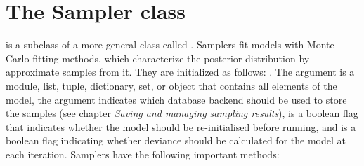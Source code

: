 \documentclass[letterpaper,10pt,english]{sphinxmanual}
\begin{document}
\section{The Sampler class}
\label{modelfitting:the-sampler-class}\label{modelfitting:sec-sampler}
 is a subclass of a more general class called . Samplers fit models with Monte Carlo fitting methods, which characterize the posterior distribution by approximate samples from it. They are initialized as follows: . The  argument is a module, list, tuple, dictionary, set, or object that contains all elements of the model, the  argument indicates which database backend should be used to store the samples (see chapter {\hyperref[database:chap-database]{\emph{Saving and managing sampling results}}}),  is a boolean flag that indicates whether the model should be re-initialised before running, and  is a boolean flag indicating whether deviance should be calculated for the model at each iteration. Samplers have the following important methods:
\end{document}
